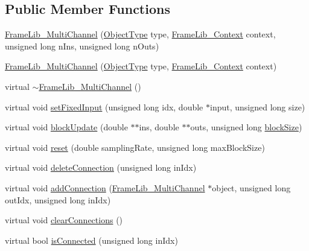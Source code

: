 \subsection*{Public Member Functions}
\begin{DoxyCompactItemize}
\item 
\hyperlink{class_frame_lib___multi_channel_a77a5841c9d5efaae5bba85e23279a0de}{Frame\+Lib\+\_\+\+Multi\+Channel} (\hyperlink{_frame_lib___types_8h_a842c5e2e69277690b064bf363c017980}{Object\+Type} type, \hyperlink{class_frame_lib___context}{Frame\+Lib\+\_\+\+Context} context, unsigned long n\+Ins, unsigned long n\+Outs)
\item 
\hyperlink{class_frame_lib___multi_channel_aae7ab1c8e9db0c7bc6e26671e1ac4ab4}{Frame\+Lib\+\_\+\+Multi\+Channel} (\hyperlink{_frame_lib___types_8h_a842c5e2e69277690b064bf363c017980}{Object\+Type} type, \hyperlink{class_frame_lib___context}{Frame\+Lib\+\_\+\+Context} context)
\item 
virtual \hyperlink{class_frame_lib___multi_channel_ab6c1272cacfc7bf3cad1e2430d4c7020}{$\sim$\+Frame\+Lib\+\_\+\+Multi\+Channel} ()
\item 
virtual void \hyperlink{class_frame_lib___multi_channel_a2bbd1050ff53556bf671282312857301}{set\+Fixed\+Input} (unsigned long idx, double $\ast$input, unsigned long size)
\item 
virtual void \hyperlink{class_frame_lib___multi_channel_a8ad8f1c0138f32ef0bfb7e4673b34d30}{block\+Update} (double $\ast$$\ast$ins, double $\ast$$\ast$outs, unsigned long \hyperlink{_frame_lib___memory_8cpp_a8ef7d53a4cac28bf580a61f265fcaaa6}{block\+Size})
\item 
virtual void \hyperlink{class_frame_lib___multi_channel_af27f3dca507c48459452be825b4c0c72}{reset} (double sampling\+Rate, unsigned long max\+Block\+Size)
\item 
virtual void \hyperlink{class_frame_lib___multi_channel_ad8b21345a7b864a48060d2475af2fe1e}{delete\+Connection} (unsigned long in\+Idx)
\item 
virtual void \hyperlink{class_frame_lib___multi_channel_ab610f5adf0eb5b287a4a81806ce9b528}{add\+Connection} (\hyperlink{class_frame_lib___multi_channel}{Frame\+Lib\+\_\+\+Multi\+Channel} $\ast$object, unsigned long out\+Idx, unsigned long in\+Idx)
\item 
virtual void \hyperlink{class_frame_lib___multi_channel_aa7dfda2331a430b0db3f43d3bde293aa}{clear\+Connections} ()
\item 
virtual bool \hyperlink{class_frame_lib___multi_channel_a25159857f4088cf179c1d7c3d62cac76}{is\+Connected} (unsigned long in\+Idx)
\end{DoxyCompactItemize}
